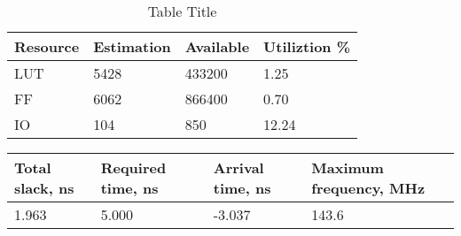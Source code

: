 \begin{table}[]
\begin{center}
\caption {Table Title} \label{tab:title2}
\begin{tabular}{|l|l|l|l|}
\hline
Resource & Estimation & Available & Utiliztion \% \\ \hline
LUT      & 5428       & 433200    & 1.25          \\
FF       & 6062       & 866400    & 0.70          \\
IO       & 104        & 850       & 12.24         \\ \hline
\end{tabular}
\end{center}
\end{table}


\begin{table}[]
\begin{center}
\begin{tabular}{|l|l|l|l|}
\hline
Total slack, ns & Required time, ns & Arrival time, ns & Maximum frequency, MHz \\ \hline
1.963           & 5.000             & -3.037           & 143.6                  \\ \hline
\end{tabular}
\end{center}
\end{table}


